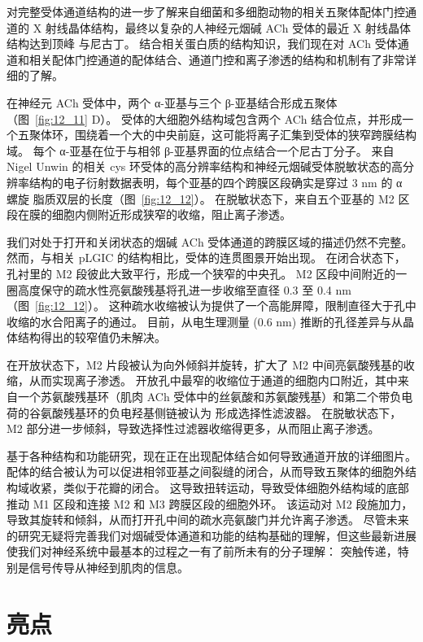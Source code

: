 对完整受体通道结构的进一步了解来自细菌和多细胞动物的相关五聚体配体门控通道的 X 射线晶体结构，最终以复杂的人神经元烟碱 ACh 受体的最近 X 射线晶体结构达到顶峰 与尼古丁。
结合相关蛋白质的结构知识，我们现在对 ACh 受体通道和相关配体门控通道的配体结合、通道门控和离子渗透的结构和机制有了非常详细的了解。


在神经元 ACh 受体中，两个 α-亚基与三个 β-亚基结合形成五聚体（图~\ref{fig:12_11} D）。
受体的大细胞外结构域包含两个 ACh 结合位点，并形成一个五聚体环，围绕着一个大的中央前庭，这可能将离子汇集到受体的狭窄跨膜结构域。
每个 α-亚基在位于与相邻 β-亚基界面的位点结合一个尼古丁分子。
来自 Nigel Unwin 的相关 cys 环受体的高分辨率结构和神经元烟碱受体脱敏状态的高分辨率结构的电子衍射数据表明，每个亚基的四个跨膜区段确实是穿过 3 nm 的 α 螺旋 脂质双层的长度（图~\ref{fig:12_12}）。
在脱敏状态下，来自五个亚基的 M2 区段在膜的细胞内侧附近形成狭窄的收缩，阻止离子渗透。


我们对处于打开和关闭状态的烟碱 ACh 受体通道的跨膜区域的描述仍然不完整。
然而，与相关 pLGIC 的结构相比，受体的连贯图景开始出现。
在闭合状态下，孔衬里的 M2 段彼此大致平行，形成一个狭窄的中央孔。
M2 区段中间附近的一圈高度保守的疏水性亮氨酸残基将孔进一步收缩至直径 0.3 至 0.4 nm（图~\ref{fig:12_12}）。
这种疏水收缩被认为提供了一个高能屏障，限制直径大于孔中收缩的水合阳离子的通过。
目前，从电生理测量 (0.6 nm) 推断的孔径差异与从晶体结构得出的较窄值仍未解决。


在开放状态下，M2 片段被认为向外倾斜并旋转，扩大了 M2 中间亮氨酸残基的收缩，从而实现离子渗透。
开放孔中最窄的收缩位于通道的细胞内口附近，其中来自一个苏氨酸残基环（肌肉 ACh 受体中的丝氨酸和苏氨酸残基）和第二个带负电荷的谷氨酸残基环的负电羟基侧链被认为 形成选择性滤波器。
在脱敏状态下，M2 部分进一步倾斜，导致选择性过滤器收缩得更多，从而阻止离子渗透。


基于各种结构和功能研究，现在正在出现配体结合如何导致通道开放的详细图片。
配体的结合被认为可以促进相邻亚基之间裂缝的闭合，从而导致五聚体的细胞外结构域收紧，类似于花瓣的闭合。 
这导致扭转运动，导致受体细胞外结构域的底部推动 M1 区段和连接 M2 和 M3 跨膜区段的细胞外环。
该运动对 M2 段施加力，导致其旋转和倾斜，从而打开孔中间的疏水亮氨酸门并允许离子渗透。
尽管未来的研究无疑将完善我们对烟碱受体通道和功能的结构基础的理解，但这些最新进展使我们对神经系统中最基本的过程之一有了前所未有的分子理解：
突触传递，特别是信号传导从神经到肌肉的信息。



\section{亮点}

